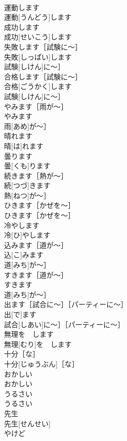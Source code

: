 \documentclass[8pt]{extreport}
\begin{document}
\begin{CJK}{UTF8}{min}
\\	運動します	
\\	運動[うんどう]します	
\\	成功します	
\\	成功[せいこう]します	
\\	失敗します［試験に〜］	
\\	失敗[しっぱい]します
\\	試験[しけん]に〜］	
\\	合格します［試験に〜］	
\\	合格[ごうかく]します
\\	試験[しけん]に〜］	
\\	やみます［雨が〜］	
\\	やみます
\\	雨[あめ]が〜］	
\\	晴れます	
\\	晴[は]れます	
\\	曇ります	
\\	曇[くも]ります	
\\	続きます［熱が〜］	
\\	続[つづ]きます
\\	熱[ねつ]が〜］	
\\	ひきます［かぜを〜］	
\\	ひきます［かぜを〜］	
\\	冷やします	
\\	冷[ひ]やします	
\\	込みます［道が〜］	
\\	込[こ]みます
\\	道[みち]が〜］	
\\	すきます［道が〜］	
\\	すきます
\\	道[みち]が〜］	
\\	出ます［試合に〜］［パーティーに〜］	
\\	出[で]ます
\\	試合[しあい]に〜］［パーティーに〜］	
\\	無理を　します	
\\	無理[むり]を　します	
\\	十分［な］	
\\	十分[じゅうぶん]［な］	
\\	おかしい	
\\	おかしい	
\\	うるさい	
\\	うるさい	
\\	先生	
\\	先生[せんせい]	
\\	やけど	

\end{CJK}
\end{document}
